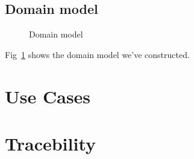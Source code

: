 \documentclass[11pt,a4paper]{article}
\newcommand{\inputdiagram}[1]{}
\newcommand{\textwidthdiagram}[2][1]{%
  \resizebox{#1\textwidth}{!}{\inputdiagram{#2}}%
}
\begin{document}
\subsection{Domain model}


\begin{figure}[H]
    \centering
    \textwidthdiagram{domain_model.tex}
    \caption{Domain model}
    \label{fig:domain_model}
\end{figure}

Fig~\ref{fig:domain_model} shows the domain model we've constructed. 
\section{Use Cases}

\section{Tracebility}



\end{document}
